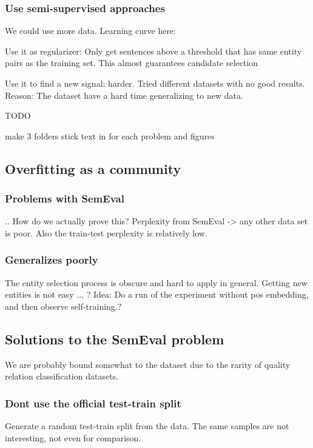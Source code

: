 \subsubsection{Use semi-supervised approaches}

We could use more data. Learning curve here:


Use it as regularizer: Only get sentences above a threshold that has same entity pairs as the training set. This almost guarantees candidate selection

Use it to find a new signal: harder. Tried different datasets with no good results. 
Reason: The dataset have a hard time generalizing to new data.  

TODO

make 3 folders
stick text in for each problem
and figures



\subsection{Overfitting as a community}

\subsubsection{Problems with SemEval}

.. How do we actually prove this? Perplexity from SemEval -> any other data set is poor. Also the train-test perplexity is relatively low.

\subsubsection{Generalizes poorly}

The entity selection process is obscure and hard to apply in general. Getting new entities is not easy ... ?
Idea: Do a run of the experiment without pos embedding, and then observe self-training.?

\subsection{Solutions to the SemEval problem}

We are probably bound somewhat to the dataset due to the rarity of quality relation classification datasets.

\subsubsection{Dont use the official test-train split}
Generate a random test-train split from the data. The same samples are not interesting, not even for comparison.

